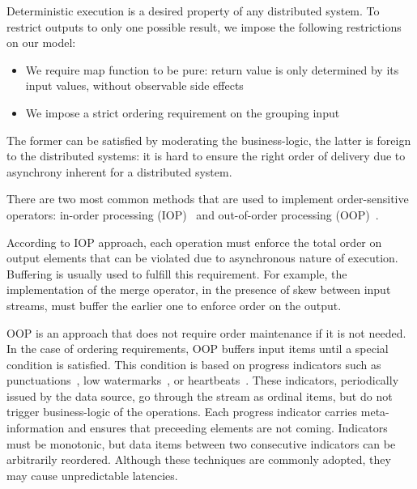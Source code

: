 \label {fs-collision}

Deterministic execution is a desired property of any distributed system. 
%
To restrict outputs to only one possible result, we impose the following  restrictions on our model: 

\begin{itemize}
  \item We require map function to be pure: return value is only determined by its input values, without observable side effects
  \item We impose a strict ordering requirement on the grouping  input
\end{itemize}

The former   can be  satisfied by moderating the  business-logic, 
the latter  is foreign to the distributed systems: 
it is hard to ensure  the right order of delivery due to  asynchrony inherent for a distributed system. 



There are two most common methods that are used to implement order-sensitive operators: in-order processing (IOP)~\cite{Arasu:2006:CCQ:1146461.1146463, Cranor:2003:GSD:872757.872838} 
and out-of-order processing (OOP)~\cite{Li:2008:OPN:1453856.1453890}.

According to IOP approach, each operation must enforce the total order on output elements that can be violated due to asynchronous nature of execution. Buffering is usually used to fulfill this requirement. For example, the implementation of the merge operator, in the presence of skew between input streams, must buffer the earlier one to enforce order on the output.

OOP is an approach that does not require order maintenance if it is not needed. 
In the case of ordering requirements, OOP buffers input items until a special condition is satisfied. 
This condition is based on progress indicators such as punctuations~\cite{Tucker:2003:EPS:776752.776780}, 
low watermarks~\cite{Akidau:2013:MFS:2536222.2536229}, or heartbeats~\cite{Srivastava:2004:FTM:1055558.1055596}. 
These indicators, periodically issued by the data source,  go through the stream as ordinal items, but do not trigger business-logic of the operations. 
Each progress indicator carries meta-information and ensures  that  preceeding elements are not coming. 
Indicators must be monotonic, but data items between two consecutive indicators can be arbitrarily reordered. 
%
Although  these techniques  are commonly adopted, they may cause unpredictable latencies.

